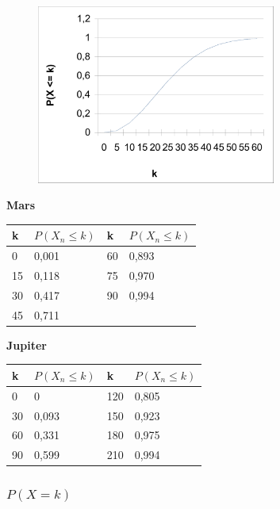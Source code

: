 \documentclass[../main.tex]{subfiles}
\begin{document}
\begin{figure}[h]
 \begin{center}
 \includegraphics[width=0.7\textwidth]{../graphics/perde.png}
\end{center}

\end{figure}


\textbf{Mars}

\begin{table}[h]
\centering
\begin{tabular}{l|l|l|l|}
k  & $P(X_{n} \leq k)$ & k  & $P(X_{n} \leq k)$ \\ \hline
0  & 0,001            & 60 & 0,893            \\
15 & 0,118            & 75 & 0,970            \\
30 & 0,417            & 90 & 0,994            \\
45 & 0,711            &    &
\end{tabular}
\end{table}

\textbf{Jupiter}

\begin{table}[h]
\centering
\begin{tabular}{l|l|l|l|}
k  & $P(X_{n} \leq k)$ & k   & $P(X_{n} \leq k)$\\ \hline
0  & 0                & 120 & 0,805            \\
30 & 0,093            & 150 & 0,923            \\
60 & 0,331            & 180 & 0,975            \\
90 & 0,599            & 210 & 0,994
\end{tabular}
\end{table}

\subsubsection{$P(X = k)$}
\end{document}
